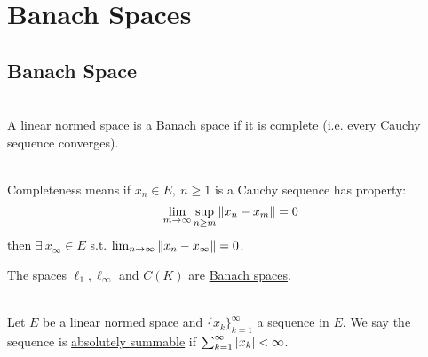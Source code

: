 \section{Banach Spaces}
\subsection{Banach Space}
\begin{definition}\ \\
A linear normed space is a \underline{Banach space} if it is complete (i.e. every Cauchy sequence converges).
\end{definition}
\begin{remark}\ \\
Completeness means if $x_n \in E,\ n \geq 1$ is a Cauchy sequence has property:
$$\lim_{m \to \infty} \sup_{n \geq m} \norm{x_n - x_m} = 0$$
then $\exists\ x_\infty \in E$ s.t. $\lim_{n \to \infty} \norm{x_n - x_\infty} = 0$.
\end{remark}
\begin{example}
The spaces $\ell_1, \ell_\infty$ and $C(K)$ are \underline{Banach spaces}.
\end{example}

\begin{remark}\ \\
Let $E$ be a linear normed space and $\{x_k\}_{k=1}^\infty$ a sequence in $E$. We say the sequence is \underline{absolutely summable} if $\sum_{k  =1}^\infty \abs{x_k} < \infty$.
\end{remark}


